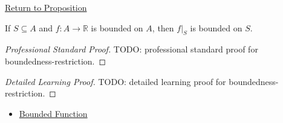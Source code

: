 \newpage
{}
\label{prf:boundedness-restriction}

\begin{remark*}[Return]
\hyperref[prop:boundedness-restriction]{Return to Proposition}
\end{remark*}

\begin{proposition*}
If \(S\subseteq A\) and \(f:A\to\mathbb{R}\) is bounded on \(A\), then
\(f|_S\) is bounded on \(S\).
\end{proposition*}

\begin{proof}[Professional Standard Proof]
\LRAProofBodyStart
TODO: professional standard proof for boundedness-restriction.
\end{proof}

\begin{proof}[Detailed Learning Proof]
\LRAProofBodyStart
TODO: detailed learning proof for boundedness-restriction.
\end{proof}

\begin{remark*}
\end{remark*}

\begin{dependencies}
\begin{itemize}
  \item \hyperref[def:function-bounded]{Bounded Function}
\end{itemize}
\end{dependencies}

\clearpage
